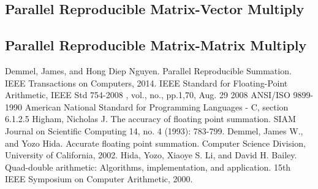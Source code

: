 \documentclass[12pt]{article}
\theoremstyle{plain}
\numberwithin{equation}{section}
\begin{document}
  \subsection{Parallel Reproducible Matrix-Vector Multiply}
  \subsection{Parallel Reproducible Matrix-Matrix Multiply}
\begin{thebibliography}{9}
    Demmel, James, and Hong Diep Nguyen. Parallel Reproducible Summation. IEEE Transactions on Computers, 2014.
    IEEE Standard for Floating-Point Arithmetic, IEEE Std 754-2008 , vol., no., pp.1,70, Aug. 29 2008
    ANSI/ISO 9899-1990 American National Standard for Programming Languages - C, section 6.1.2.5
    Higham, Nicholas J. The accuracy of floating point summation. SIAM Journal on Scientific Computing 14, no. 4 (1993): 783-799.
    Demmel, James W., and Yozo Hida. Accurate floating point summation. Computer Science Division, University of California, 2002.
    Hida, Yozo, Xiaoye S. Li, and David H. Bailey. Quad-double arithmetic: Algorithms, implementation, and application. 15th IEEE Symposium on Computer Arithmetic, 2000.
\end{thebibliography}
\end{document}
